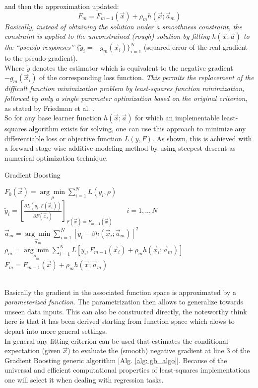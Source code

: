 \documentclass[12pt, a4paper]{article}
\begin{document}
and then the approximation updated:
\begin{equation}
    F_{m} = F_{m-1}(\vec{x}) + \rho_m h(\vec{x};\vec{a}_m)
\end{equation}
\textit{Basically, instead of obtaining the solution under a smoothness constraint, the constraint is applied to the unconstrained (rough) solution by fitting $h(\vec{x};\vec{a})$ to the ``pseudo-responses'' $\{\tilde{y}_i = - g_m(\vec{x}_i)\}_{i=1}^N$} (squared error of the real gradient to the pseudo-gradient). \\
Where $\tilde{y}$ denotes the estimator which is equivalent to the negative gradient $- g_m(\vec{x}_i)$ of the corresponding loss function.
\textit{This permits the replacement of the difficult function minimization problem by least-squares function minimization, followed by only a single parameter optimization based on the original criterion}, as stated by Friedman et al. \cite{Friedman2001}.\\
So for any base learner function $h(\vec{x};\vec{a})$ for which an implementable least-squares algorithm exists for solving, one can use this approach to minimize any differentiable loss or objective function $L(y,F)$.
As shown, this is achieved with a forward stage-wise additive modeling method by using steepest-descent as numerical optimization technique.
\begin{algorithm}
\caption{Gradient Boosting \cite{Friedman2001}}
\label{alg: gb_algo}
    $F_0(\vec{x}) = \underset{\rho}{\arg\min} \sum_{i=1}^N L(y_i,\rho)$ \\
    {$\tilde{y}_i = [\frac{\partial L(y_i, F(\vec{x}_i))}{\partial F(\vec{x}_i)}]_{F(\vec{x}) = F_{m-1}(\vec{x})} \qquad i = 1,..,N$ \\
    $\vec{a}_m = \underset{ \vec{a}_m}{\arg\min}
    \sum_{i=1}^N [\tilde{y}_i - \beta h(\vec{x}_i;\vec{a}_m)]^2$ \\
    $\rho_m = \underset{\rho_m}{\arg\min} \sum_{i=1}^N L[y_i,F_{m-1}(\vec{x}_i) + \rho_m h(\vec{x}_i;\vec{a}_m)]$ \\
    $F_{m} = F_{m-1}(\vec{x}) + \rho_m h(\vec{x};\vec{a}_m)$
    }
\end{algorithm}
\\
Basically the gradient in the associated function space is approximated by a \textit{parameterized function}. The parametrization then allows to generalize towards unseen data inputs. This can also be constructed directly, the noteworthy think here is that it has been derived starting from function space which alows to depart into more general settings. \\
In general any fitting criterion can be used that estimates the conditional expectation (given $\vec{x}$) to evaluate the (smooth) negative gradient at line 3 of the Gradient Boosting generic algorithm [Alg. \ref{alg: gb_algo}]. Because of the universal and efficient computational properties of least-squares implementations one will select it when dealing with regression tasks.
\end{document}
